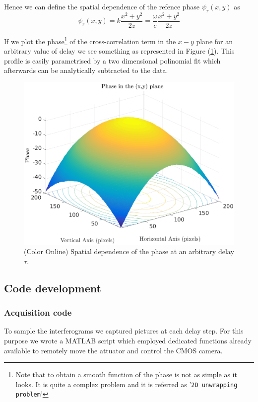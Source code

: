 \documentclass[12pt,a4paper,twoside]{article}
\begin{document}
Hence we can define the spatial dependence of the refence phase $\psi_r(x,y)$ as
\begin{equation}
	\psi_r(x,y) = k\frac{x^2+y^2}{2z} = \frac{\omega}{c}\frac{x^2+y^2}{2z}
\end{equation}

If we plot the phase\footnote{Note that to obtain a smooth function of the phase is not as simple as it looks. It is quite a complex problem and it is referred as '\texttt{2D unwrapping problem}'} of the cross-correlation term in the $x-y$ plane for an arbitrary value of delay we see something as represented in Figure (\ref{fig_paraboloid}).
This profile is easily parametrised by a two dimensional polinomial fit which afterwards can be analytically subtracted to the data.

\begin{figure}[hb]
	\centering
	\includegraphics[scale=0.7]{data/paraboloid}
	\caption{(Color Online) Spatial dependence of the phase at an arbitrary delay $\tau$.}
	\label{fig_paraboloid}
\end{figure}

\subsection{Code development}
\subsubsection*{Acquisition code}
To sample the interferograms we captured pictures at each delay step.
For this purpose we wrote a MATLAB script which employed dedicated functions already available to remotely move the attuator and control the CMOS camera.
\end{document}
